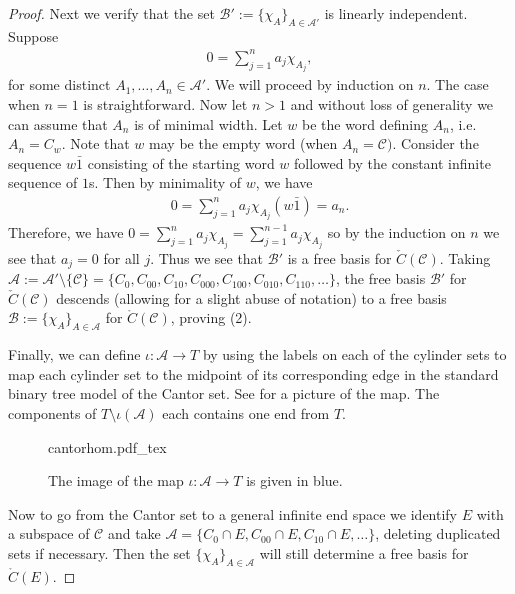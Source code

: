 \documentclass[11pt]{amsart}
\theoremstyle{plain}
\theoremstyle{definition}
\newcommand{\cC}{\mathcal{C}}
\newcommand{\cA}{\mathcal{A}}
\newcommand{\<}{\langle}
\renewcommand{\>}{\rangle}
\newcommand{\ceC}{\check{C}}
\newcommand{\dC}{\mathring{C}}
\begin{document}
\begin{proof}
    Next we verify that the set $\mathcal{B}':=\{\chi_{A}\}_{A \in \mathcal{A}'}$ is linearly independent. Suppose
    \begin{align*}
        0=\sum_{j=1}^{n} a_{j} \chi_{A_{j}},
    \end{align*}
    for some distinct $A_1,\ldots,A_n \in \cA'$.
    We will proceed by induction on $n$. The case when $n=1$ is straightforward. Now let $n>1$ and without loss of generality we can assume that $A_{n}$ is of minimal width. Let $w$ be the word defining $A_{n}$, i.e. $A_{n} = C_{w}$. Note that $w$ may be the empty word (when $A_n = \cC)$. Consider the sequence $w\bar{1}$ consisting of the starting word $w$ followed by the constant infinite sequence of $1$s. Then by minimality of $w$, we have
    \begin{align*}
        0 = \sum_{j=1}^{n} a_{j} \chi_{A_{j}}(w\bar{1}) = a_{n}.
    \end{align*}
    Therefore, we have 
        $0=\sum_{j=1}^{n} a_{j} \chi_{A_{j}} = \sum_{j=1}^{n-1} a_{j} \chi_{A_{j}}$
    so by the induction on $n$ we see that $a_{j} = 0$ for all $j$. Thus we see that $\mathcal{B}'$ is a free basis for $\ceC(\cC)$. Taking $\mathcal{A}:= \mathcal{A}' \setminus \{\mathcal{C} \} = \{C_{0},C_{00},C_{10},C_{000},C_{100},C_{010},C_{110},\ldots\}$, the free basis $\mathcal{B}'$ for $\ceC(\cC)$ descends (allowing for a slight abuse of notation) to a free basis $\mathcal{B}:=\{\chi_{A}\}_{A \in \cA}$ for $\dC(\cC)$, proving (2).

    Finally, we can define $\iota: \cA \rightarrow T$ by using the labels on each of the cylinder sets to map each cylinder set to the midpoint of its corresponding edge in the standard binary tree model of the Cantor set. See  for a picture of the map. The components of $T\setminus \iota(\cA)$ each contains one end from $T$.

    \begin{figure}[ht!]
	    \centering
	    \def\svgwidth{.6\textwidth}
		    {cantorhom.pdf_tex}
		    \caption{The image of the map $\iota: \mathcal{A} \to T$ is given in blue.}
	    \label{fig:cantorhom}
\end{figure}

    Now to go from the Cantor set to a general infinite end space we identify $E$ with a subspace of $\cC$ and take $\cA = \{C_{0} \cap E, C_{00} \cap E,C_{10} \cap E,\ldots \}$, deleting duplicated sets if necessary.
    Then the set $\{\chi_A\}_{A \in \cA}$ will still determine a free basis for $\dC(E)$. 
\end{proof}
\end{document}
